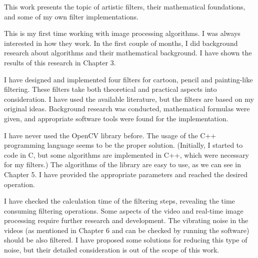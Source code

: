 This work presents the topic of artistic filters, their mathematical foundations, and some of my own filter implementations. 

This is my first time working with image processing algorithms. I was always interested in how they work. In the first couple of months, I did background research about algorithms and their mathematical background. I have shown the results of this research in Chapter 3. 

I have designed and implemented four filters for cartoon, pencil and painting-like filtering. These filters take both theoretical and practical aspects into consideration. I have used the available literature, but the filters are based on my original ideas. Background research was conducted, mathematical formulas were given, and appropriate software tools were found for the implementation. 

I have never used the OpenCV library before. The usage of the C++ programming language seems to be the proper solution. (Initially, I started to code in C, but some algorithms are implemented in C++, which were necessary for my filters.) The algorithms of the library are easy to use, as we can see in Chapter 5. I have provided the appropriate parameters and reached the desired operation. 

I have checked the calculation time of the filtering steps, revealing the time consuming filtering operations. Some aspects of the video and real-time image processing require further research and development. The vibrating noise in the videos (as mentioned in Chapter 6 and can be checked by running the software) should be also filtered. I have proposed some solutions for reducing this type of noise, but their detailed consideration is out of the scope of this work.
